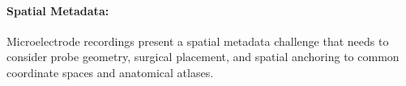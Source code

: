 \documentclass[fleqn,10pt]{article}
\begin{document}

\paragraph*{Spatial Metadata:}\label{sec:spatial-metadata}
Microelectrode recordings present a spatial metadata challenge that needs to consider probe geometry, surgical placement, and spatial anchoring to common coordinate spaces and anatomical atlases.
\end{document}
